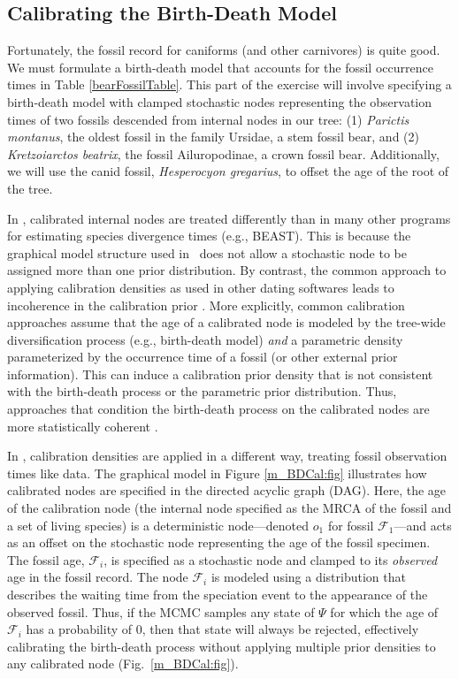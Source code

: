 \bigskip
\subsection{Calibrating the Birth-Death Model}\label{brMods} 

Fortunately, the fossil record for caniforms (and other carnivores) is quite good. 
We must formulate a birth-death model that accounts for the fossil occurrence times in Table \ref{bearFossilTable}. 
This part of the exercise will involve specifying a birth-death model with clamped stochastic nodes representing the observation times of two fossils descended from internal nodes in our tree: (1) \textit{Parictis montanus}, the oldest fossil in the family Ursidae, a stem fossil bear, and (2) \textit{Kretzoiarctos beatrix}, the fossil Ailuropodinae, a crown fossil bear.
Additionally, we will use the canid fossil, \textit{Hesperocyon gregarius}, to offset the age of the root of the tree. 

In \RevBayes, calibrated internal nodes are treated differently than in many other programs for estimating species divergence times (e.g., BEAST).
This is because the graphical model structure used in \RevBayes~does not allow a stochastic node to be assigned more than one prior distribution. 
By contrast, the common approach to applying calibration densities as used in other dating softwares leads to incoherence in the calibration prior \citep[for detailed explainations of this see][]{warnock12,heled12,heath2013fossilized}. 
More explicitly, common calibration approaches assume that the age of a calibrated node is modeled by the tree-wide diversification process (e.g., birth-death model) \textit{and} a parametric density parameterized by the occurrence time of a fossil (or other external prior information).
This can induce a calibration prior density that is not consistent with the birth-death process or the parametric prior distribution. 
Thus, approaches that condition the birth-death process on the calibrated nodes are more statistically coherent \citep{yang06}.

In \RevBayes, calibration densities are applied in a different way, treating fossil observation times like data. 
The graphical model in Figure \ref{m_BDCal:fig} illustrates how calibrated nodes are specified in the directed acyclic graph (DAG).
Here, the age of the calibration node (\IE the internal node specified as the MRCA of the fossil and a set of living species) is a deterministic node---\EG denoted $o_1$ for fossil $\mathcal{F}_1$---and acts as an offset on the stochastic node representing the age of the fossil specimen.
The fossil age, $\mathcal{F}_i$, is specified as a stochastic node and clamped to its \textit{observed} age in the fossil record. 
The node $\mathcal{F}_i$ is modeled using a distribution that describes the waiting time from the speciation event to the appearance of the observed fossil. 
Thus, if the MCMC samples any state of $\Psi$ for which the age of $\mathcal{F}_i$ has a probability of 0, then that state will always be rejected, effectively calibrating the birth-death process without applying multiple prior densities to any calibrated node (Fig.~\ref{m_BDCal:fig}).

